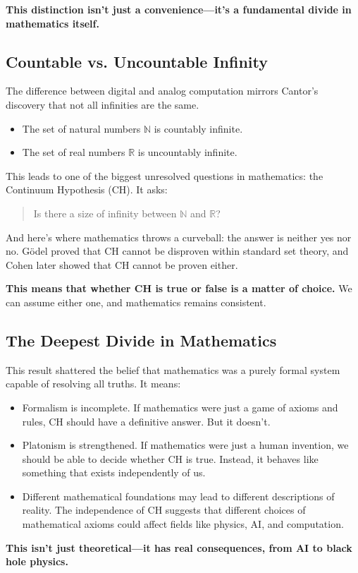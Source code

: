 \textbf{This distinction isn’t just a convenience—it’s a fundamental divide in mathematics itself.} 

\subsection{Countable vs. Uncountable Infinity}

The difference between digital and analog computation mirrors Cantor’s discovery that not all infinities are the same.

\begin{itemize}
    \item The set of natural numbers \( \mathbb{N} \) is countably infinite.
    \item The set of real numbers \( \mathbb{R} \) is uncountably infinite.
\end{itemize}

This leads to one of the biggest unresolved questions in mathematics: the Continuum Hypothesis (CH). It asks:

\begin{quote}
Is there a size of infinity between \( \mathbb{N} \) and \( \mathbb{R} \)?
\end{quote}

And here’s where mathematics throws a curveball: the answer is neither yes nor no. Gödel proved that CH cannot be disproven within standard set theory, and Cohen later showed that CH cannot be proven either.

\textbf{This means that whether CH is true or false is a matter of choice.} We can assume either one, and mathematics remains consistent.

\subsection{The Deepest Divide in Mathematics}

This result shattered the belief that mathematics was a purely formal system capable of resolving all truths. It means:

\begin{itemize}
    \item Formalism is incomplete. If mathematics were just a game of axioms and rules, CH should have a definitive answer. But it doesn’t.
    \item Platonism is strengthened. If mathematics were just a human invention, we should be able to decide whether CH is true. Instead, it behaves like something that exists independently of us.
    \item Different mathematical foundations may lead to different descriptions of reality. The independence of CH suggests that different choices of mathematical axioms could affect fields like physics, AI, and computation.
\end{itemize}

\textbf{This isn’t just theoretical—it has real consequences, from AI to black hole physics.}

